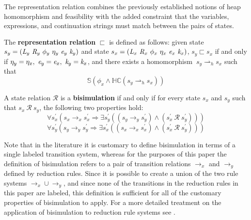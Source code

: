 The representation relation combines the previously established notions of heap homomorphism and feasibility with the added constraint that the variables, expressions, and continuation strings must match between the pairs of states. 

\begin{definition}
\label{representation}
The \textbf{representation relation} $\sqsubset$ is defined as follows: given state $s_y = ( \emph{L}_y\ \emph{R}_y\ \phi_y\ \eta_y\ \emph{e}_y\ \emph{k}_y )$ and state $s_x = ( \cfgnt{L}_x\ \cfgnt{R}_x\ \phi_x\ \eta_x\ \cfgnt{e}_x\ \cfgnt{k}_x )$, $s_y \sqsubset s_x $ if and only if $\eta_y = \eta_x ,\ \emph{e}_y = \emph{e}_x ,\ \emph{k}_y = \emph{k}_x$, and there exists a homomorphism $\ s_y \rightharpoonup_{h} s_x $ such that 
\begin{equation}
\label{eqn:valid}
 \mathbb{S}( \phi_x \wedge \mathbb{HC}(s_y \rightharpoonup_{h} s_x) ) 
\end{equation}
\end{definition}

\begin{definition}
\label{bisimulation}
A state relation $\mathcal{R}$ is a \textbf{bisimulation} if and only if for every state $s_x$ and $s_y$ such that $s_x\ \mathcal{R}\ s_y$, the following two properties hold: 
\begin{equation}
\label{eqn:BisimulationForwards}
\forall s_x^\prime ( s_x \rightarrow_x s_x^\prime \Rightarrow \exists s_y^\prime( (s_y \rightarrow_y s_y^\prime )\wedge (s_x^\prime\ \mathcal{R}\ s_y^\prime ))  )
\end{equation}
\begin{equation}
\label{eqn:BisimulationBackwards}
\forall s_y^\prime ( s_y \rightarrow_y s_y^\prime\Rightarrow \exists s_x^\prime( (s_x \rightarrow_x s_x^\prime )\wedge (s_x^\prime\ \mathcal{R}\ s_y^\prime ))  )
\end{equation}
\end{definition}

Note that in the literature it is customary to define bisimulation in terms of a single labeled transition system, whereas for the purposes of this paper the definition of bisimulation refers to a pair of transition relations $\rightarrow_x$ and $\rightarrow_y$ defined by reduction rules. Since it is possible to create a union of the two rule systems $\rightarrow_x \cup \rightarrow_y$, and since none of the transitions in the reduction rules in this paper are labeled, this definition is sufficient for all of the customary properties of bisimulation to apply. For a more detailed treatment on the application of bisimulation to reduction rule systems see \cite{GSE:barbedbisimulation}.


